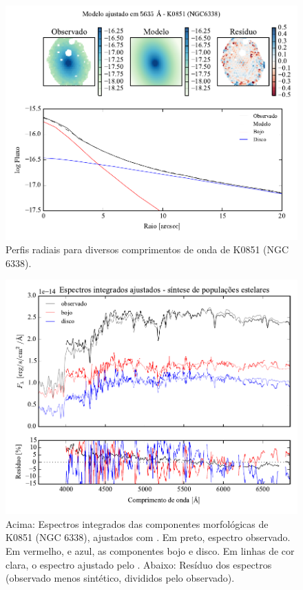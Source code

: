\begin{figure}
	\includegraphics[page=5]{figuras-decomp/K0851_sample006a}
	\caption[Perfis radiais para diversos comprimentos de onda de K0851 (NGC 6338)]
	{Perfis radiais para diversos comprimentos de onda de K0851 (NGC 6338).}
	\label{fig:decompRadprofSpec:K0851}
\end{figure}

\begin{figure}
	\includegraphics[page=13,width=\textwidth]{figuras/sample006a_synthesis}
	\caption[Espectros ajustados com \starlight das componentes morfológicas de
	K0851 (NGC 6338)]
	{Acima: Espectros integrados das componentes morfológicas de
	K0851 (NGC 6338), ajustados com \starlight. Em preto, espectro observado. Em
	vermelho, e azul, as componentes bojo e disco. Em linhas de cor clara, o
	espectro ajustado pelo \starlight. Abaixo: Resíduo dos espectros (observado
	menos sintético, divididos pelo observado).}
	\label{fig:decompSintese:K0851}
\end{figure}

